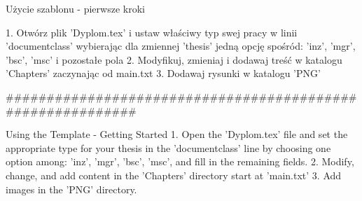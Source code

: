Użycie szablonu - pierwsze kroki

1. Otwórz plik 'Dyplom.tex' i ustaw właściwy typ swej pracy w linii 'documentclass' wybierając dla zmiennej 'thesis' jedną opcję spośród: 'inz', 'mgr', 'bsc', 'msc' i pozostałe pola
2. Modyfikuj, zmieniaj i dodawaj treść w katalogu 'Chapters' zaczynając od main.txt
3. Dodawaj rysunki w katalogu 'PNG'

###########################################################

Using the Template - Getting Started
1. Open the 'Dyplom.tex' file and set the appropriate type for your thesis in the 'documentclass' line by choosing one option among: 'inz', 'mgr', 'bsc', 'msc', and fill in the remaining fields.
2. Modify, change, and add content in the 'Chapters' directory start at 'main.txt'
3. Add images in the 'PNG' directory.